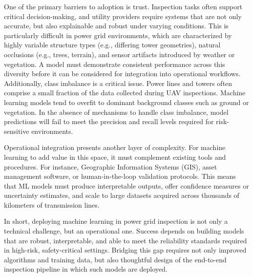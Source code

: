 One of the primary barriers to adoption is trust. Inspection tasks often
support critical decision-making, and utility providers require systems that
are not only accurate, but also explainable and robust under varying
conditions. This is particularly difficult in power grid environments, which
are characterized by highly variable structure types (e.g., differing tower
geometries), natural occlusions (e.g., trees, terrain), and sensor artifacts
introduced by weather or vegetation. A model must demonstrate consistent
performance across this diversity before it can be considered for integration
into operational workflows.
%
Additionally, class imbalance is a critical issue. Power lines and towers often
comprise a small fraction of the data collected during UAV inspections. Machine
learning models tend to overfit to dominant background classes such as ground
or vegetation. In the absence of mechanisms to handle class imbalance, model
predictions will fail to meet the precision and recall levels required for
risk-sensitive environments.

Operational integration presents another layer of complexity. For machine
learning to add value in this space, it must complement existing tools and
procedures. For instance, Geographic Information Systems (GIS), asset
management software, or human-in-the-loop validation protocols. This means that
ML models must produce interpretable outputs, offer confidence measures or
uncertainty estimates, and scale to large datasets acquired across thousands of
kilometers of transmission lines.

In short, deploying machine learning in power grid inspection is not only a
technical challenge, but an operational one. Success depends on building models
that are robust, interpretable, and able to meet the reliability standards
required in high-risk, safety-critical settings. Bridging this gap requires not
only improved algorithms and training data, but also thoughtful design of the
end-to-end inspection pipeline in which such models are deployed.

